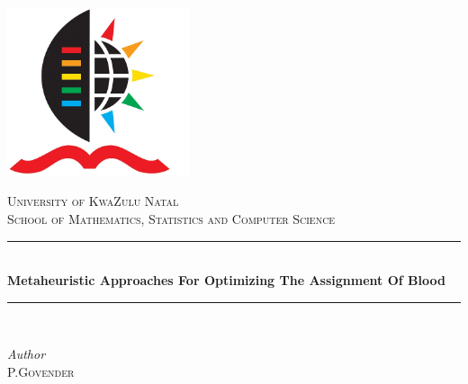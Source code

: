 \documentclass[12pt]{article}
\begin{document}
\begin{titlepage} %



	\newcommand{\HRule}{\rule{\linewidth}{0.5mm}} %
	
	\center %
	
	
	\begin {center}
\includegraphics[width=0.4\textwidth, center]{ukzn.png}
\end {center}
	\textsc{\small University of KwaZulu Natal\\ School of Mathematics, Statistics and Computer Science}\\[0.5cm] %
	
	
	
	\HRule\\[0.4cm]
	
	{\huge\bfseries Metaheuristic Approaches For Optimizing The Assignment Of Blood}\\[0.4cm] %
	
	\HRule\\[1.5cm]
	
	
	\begin{minipage}{0.4\textwidth}
		\begin{flushleft}
			\large
			\textit{Author}\\
			 \textsc{P.Govender} %


\end{flushleft}
\end{minipage}
\end{titlepage}
\end{document}
